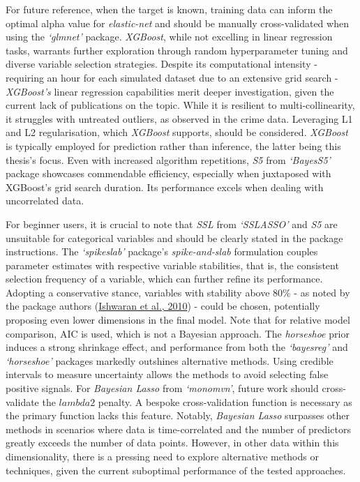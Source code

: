 \documentclass[
  11pt,
]{article}
\begin{document}
For future reference, when the target is known, training data can inform
the optimal alpha value for \emph{elastic-net} and should be manually
cross-validated when using the \emph{`glmnet'} package. \emph{XGBoost},
while not excelling in linear regression tasks, warrants further
exploration through random hyperparameter tuning and diverse variable
selection strategies. Despite its computational intensity - requiring an
hour for each simulated dataset due to an extensive grid search -
\emph{XGBoost's} linear regression capabilities merit deeper
investigation, given the current lack of publications on the topic.
While it is resilient to multi-collinearity, it struggles with untreated
outliers, as observed in the crime data. Leveraging L1 and L2
regularisation, which \emph{XGBoost} supports, should be considered.
\emph{XGBoost} is typically employed for prediction rather than
inference, the latter being this thesis's focus. Even with increased
algorithm repetitions, \emph{S5} from \emph{`BayesS5'} package showcases
commendable efficiency, especially when juxtaposed with XGBoost's grid
search duration. Its performance excels when dealing with uncorrelated
data.

For beginner users, it is crucial to note that \emph{SSL} from
\emph{`SSLASSO'} and \emph{S5} are unsuitable for categorical variables
and should be clearly stated in the package instructions. The
\emph{`spikeslab'} package's \emph{spike-and-slab} formulation couples
parameter estimates with respective variable stabilities, that is, the
consistent selection frequency of a variable, which can further refine
its performance. Adopting a conservative stance, variables with
stability above 80\% - as noted by the package authors
(\protect\hyperlink{ref-Ishwaran2010}{Ishwaran et al., 2010}) - could be
chosen, potentially proposing even lower dimensions in the final model.
Note that for relative model comparison, AIC is used, which is not a
Bayesian approach. The \emph{horseshoe} prior induces a strong shrinkage
effect, and performance from both the \emph{`bayesreg'} and
\emph{`horseshoe'} packages markedly outshines alternative methods.
Using credible intervals to measure uncertainty allows the methods to
avoid selecting false positive signals. For \emph{Bayesian Lasso} from
\emph{`monomvn'}, future work should cross-validate the \(lambda2\)
penalty. A bespoke cross-validation function is necessary as the primary
function lacks this feature. Notably, \emph{Bayesian Lasso} surpasses
other methods in scenarios where data is time-correlated and the number
of predictors greatly exceeds the number of data points. However, in
other data within this dimensionality, there is a pressing need to
explore alternative methods or techniques, given the current suboptimal
performance of the tested approaches.
\end{document}
